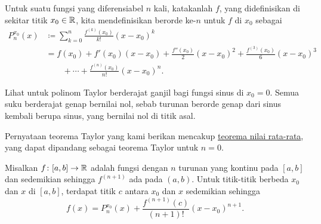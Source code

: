 \begin{defn}
Untuk suatu fungsi yang diferensiabel $n$ kali, katakanlah $f$, yang didefinisikan di sekitar titik $x_0 \in {\mathbb{R}}$, kita mendefinisikan
\emph{} berorde ke-$n$%
untuk $f$ di $x_0$ sebagai
\begin{equation*}
\begin{split}
P_n^{x_0}(x)
& \coloneqq
\sum_{k=0}^n
\frac{f^{(k)}(x_0)}{k!}{(x-x_0)}^k
\\
& =
f(x_0)
+ f'(x_0)(x-x_0)
+ \frac{f''(x_0)}{2}{(x-x_0)}^2
+ \frac{f^{(3)}(x_0)}{6}{(x-x_0)}^3
\\
& \qquad
+ \cdots
+ \frac{f^{(n)}(x_0)}{n!}{(x-x_0)}^n .
\end{split}
\end{equation*}
\end{defn}

Lihat  untuk
polinom Taylor berderajat ganjil bagi fungsi sinus di $x_0=0$.
Semua suku berderajat genap bernilai nol, sebab turunan berorde genap 
dari sinus kembali berupa sinus, yang bernilai nol di titik asal.
\begin{myfigureht}
\caption{Polinom Taylor berderajat ganjil untuk fungsi
sinus.\label{fig:taylorsin}}
\end{myfigureht}

Pernyataan teorema Taylor yang kami berikan mencakup
\hyperref[thm:mvt]{teorema nilai rata-rata}, yang dapat dipandang sebagai
teorema Taylor untuk $n=0$.

\begin{thm}[Taylor] \label{thm:taylor}
Misalkan $f \colon [a,b] \to {\mathbb{R}}$ adalah fungsi dengan $n$ turunan yang
kontinu pada $[a,b]$ dan sedemikian sehingga $f^{(n+1)}$ ada pada $(a,b)$.
Untuk titik-titik berbeda $x_0$ dan $x$ di $[a,b]$,
terdapat titik $c$ antara $x_0$
dan $x$ sedemikian sehingga
\begin{equation*}
f(x)=P_{n}^{x_0}(x)+\frac{f^{(n+1)}(c)}{(n+1)!}{(x-x_0)}^{n+1} .
\end{equation*}
\end{thm}

